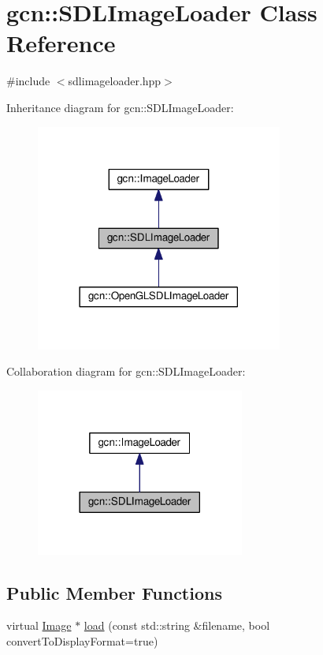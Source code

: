 \hypertarget{classgcn_1_1SDLImageLoader}{}\section{gcn\+:\+:S\+D\+L\+Image\+Loader Class Reference}
\label{classgcn_1_1SDLImageLoader}


{\ttfamily \#include $<$sdlimageloader.\+hpp$>$}



Inheritance diagram for gcn\+:\+:S\+D\+L\+Image\+Loader\+:\nopagebreak
\begin{figure}[H]
\begin{center}
\leavevmode
\includegraphics[width=230pt]{classgcn_1_1SDLImageLoader__inherit__graph}
\end{center}
\end{figure}


Collaboration diagram for gcn\+:\+:S\+D\+L\+Image\+Loader\+:\nopagebreak
\begin{figure}[H]
\begin{center}
\leavevmode
\includegraphics[width=194pt]{classgcn_1_1SDLImageLoader__coll__graph}
\end{center}
\end{figure}
\subsection*{Public Member Functions}
\begin{DoxyCompactItemize}
\item 
virtual \hyperlink{classgcn_1_1Image}{Image} $\ast$ \hyperlink{classgcn_1_1SDLImageLoader_ab22c9ab6175e52d0c76a11cae64bdd1f}{load} (const std\+::string \&filename, bool convert\+To\+Display\+Format=true)
\end{DoxyCompactItemize}
